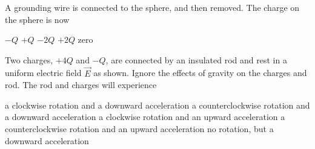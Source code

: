 \documentclass{../../oss-apphys-exam}
\begin{document}
\begin{multicols*}{2}
\begin{questions}
    \question A grounding wire is connected to the sphere, and then removed. The
    charge on the sphere is now
    \begin{choices}
      \choice $-Q$
      \choice $+Q$
      \choice $-2Q$
      \choice $+2Q$
      \choice zero
    \end{choices}
    \label{cond2}
    \columnbreak
    
    \question Two charges, $+4Q$ and $-Q$, are connected by an insulated rod and
    rest in a uniform electric field $\vec E$ as shown. Ignore the effects of
    gravity on the charges and rod. The rod and charges will experience
    \begin{choices}
      \choice a clockwise rotation and a downward acceleration
      \choice a counterclockwise rotation and a downward acceleration
      \choice a clockwise rotation and an upward acceleration
      \choice a counterclockwise rotation and an upward acceleration
      \choice no rotation, but a downward acceleration
    \end{choices}
    \vspace{.7in}
  
  

\end{questions}
\end{multicols*}
\end{document}
